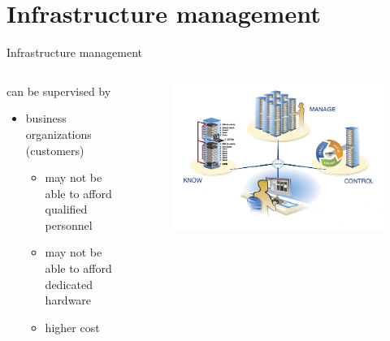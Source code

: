 %
%
\section{Infrastructure management}
\begin{frame}{Infrastructure management}
	\only<1>
	{
		\begin{columns}
			\begin{column}{0.6\textwidth}
				can be supervised by
				\begin{itemize}
					\item{\footnotesize{business organizations (customers)}}
					\begin{itemize}
						\item{\scriptsize{may not be able to afford qualified personnel}}
						\item{\scriptsize{may not be able to afford dedicated hardware}}
						\item{\scriptsize{higher cost}}
					\end{itemize}
				\end{itemize}
			\end{column}
			\begin{column}{0.4\textwidth}
				\begin{figure}
					\centering{}
					\includegraphics[scale=0.2]{images/scenarios.png}
				\end{figure}

\end{column}
\end{columns}}
\end{frame}
